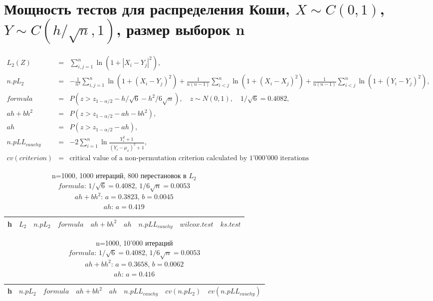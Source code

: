 \documentclass{report}
\begin{document}
\chapter*{Мощность тестов для распределения Коши, $X\sim C(0,1)$, $Y\sim C(h/\sqrt{n},1)$, размер выборок n}

\begin{eqnarray}
  L_2(Z)&=&\sum_{i,j=1}^{n}{\ln(1+|X_{i}-Y_{j}|^2)},\\
  n.pL_2 &=& -\frac{1}{n^2}\sum_{i,j=1}^n\ln(1+(X_i-Y_j)^2)+\frac{1}{n(n-1)}\sum_{i<j}^n\ln(1+(X_i-X_j)^2)+\frac{1}{n(n-1)}\sum_{i<j}^n\ln(1+(Y_i-Y_j)^2),\\
  formula &=& P(z > z_{1-\alpha/2} - h/\sqrt{6} - h^2/6\sqrt{n}),\quad z\sim N(0,1),\quad 1/\sqrt{6}=0.4082, \\
  ah+bh^2 &=& P(z > z_{1-\alpha/2} - ah - bh^2), \\
  ah &=& P(z > z_{1-\alpha/2} - ah), \\
  n.pLL_{cauchy} &=& -2\sum_{i=1}^n\ln\frac{Y_i^2+1}{(Y_i-\mu_x)^2+1},\\
  cv(criterion) &=& \text{critical value of a non-permutation criterion calculated by 1'000'000 iterations}
\end{eqnarray}

\begin{longtable}{|c|c|c|c|c|c|c|c|c|}
  \caption{n=1000, 1000 итераций, 800 перестановок в $L_2$ \\
  $formula$: $1/\sqrt{6}=0.4082$, $1/6\sqrt{n}=0.0053$ \\
  $ah+bh^2$: $a=0.3823$, $b=0.0045$ \\
  $ah$: $a=0.419$} \\
  \hline
  h & $L_2$ & $n.pL_2$ & $formula$ & $ah+bh^2$ & $ah$ & $n.pLL_{cauchy}$ & $wilcox.test$ & $ks.test$ \\ \hline
  
  \hline
\end{longtable}

\begin{longtable}{|c|c|c|c|c|c|c|c|}
  \caption{n=1000, 10'000 итераций \\
  $formula$: $1/\sqrt{6}=0.4082$, $1/6\sqrt{n}=0.0053$ \\
  $ah+bh^2$: $a=0.3658$, $b=0.0062$ \\
  $ah$: $a=0.416$} \\
  \hline
  h & $n.pL_2$ & $formula$ & $ah+bh^2$ & $ah$ & $n.pLL_{cauchy}$ & $cv(n.pL_2)$ & $cv(n.pLL_{cauchy})$ \\ \hline
  
  \hline
\end{longtable}
\end{document}
